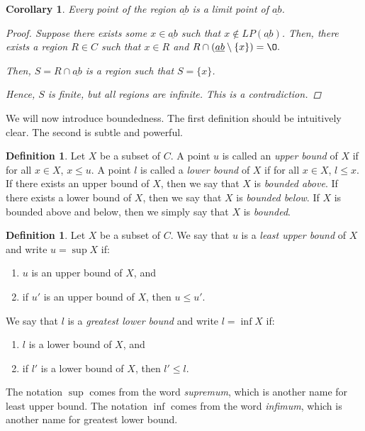 \documentclass[11pt]{article}
\renewcommand{\emptyset}{\O}
\renewcommand{\_}[1]{\underline{ #1 }}
\newtheorem{corollary}[theorem]{Corollary}
\theoremstyle{definition}
\newtheorem{definition}[theorem]{Definition}
\numberwithin{equation}{subsection}
\begin{document}
\begin{corollary}  Every point of the region $\_{ab}$ is a limit point of $\_{ab}$.
\begin{proof}
Suppose there exists some $x \in \_{ab}$ such that $x \notin LP(\_{ab})$. Then, there exists a region $R \in C$ such that $x \in R$ and $R \cap (\_{ab} \setminus \{x\}) = \emptyset.$

Then, $S = R \cap \_{ab}$ is a region such that $S = \{x\}$. 

Hence, $S$ is finite, but all regions are infinite. This is a contradiction.

\renewcommand\qedsymbol{QED}
\end{proof}
\end{corollary}




We will now introduce boundedness.   The first definition should be intuitively clear.  The second is subtle and powerful.  


\begin{definition}  Let $X$ be a subset of $C$.  A point $u$ is called an \emph{upper bound} of $X$ if for all $x \in X$, $x \leq u$.  A point $l$ is called a \emph{lower bound} of $X$ if for all $x \in X$, $l \leq x$.  If there exists an upper bound of $X$, then we say that $X$ is \emph{bounded above}.  If there exists a lower bound of $X$, then we say that $X$ is \emph{bounded below}.  If $X$ is bounded above and below, then we simply say that $X$ is \emph{bounded}.
\end{definition}


\begin{definition}  Let $X$ be a subset of $C$.  We say that $u$ is a \emph{least upper bound} of $X$ and write $u = \sup X$ if:
\begin{enumerate}
\item  $u$ is an upper bound of $X$, and
\item  if $u'$ is an upper bound of $X$, then $u \leq u'$.
\end{enumerate}
We say that $l$ is a \emph{greatest lower bound} and write $l = \inf X$ if:
\begin{enumerate}
\item $l$ is a lower bound of $X$, and
\item if $l'$ is a lower bound of $X$, then $l' \leq l$.
\end{enumerate}
\end{definition}

\noindent The notation $\sup$ comes from the word \emph{supremum}, which is another name for least upper bound.  The notation $\inf$ comes from the word \emph{infimum}, which is another name for greatest lower bound.
\end{document}
